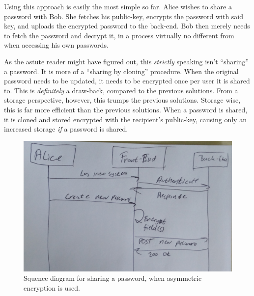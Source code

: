 				Using this approach is easily the most simple so far. Alice wishes to share a password with Bob. She fetches his public-key, encrypts the password with said key, and uploads the encrypted password to the back-end. Bob then merely needs to fetch the password and decrypt it, in a process virtually no different from when accessing his own passwords.

				As the astute reader might have figured out, this \emph{strictly} speaking isn't ``sharing'' a password. It is more of a ``sharing by cloning'' procedure. When the original password needs to be updated, it needs to be encrypted once per user it is shared to. This is \emph{definitely} a draw-back, compared to the previous solutions. From a storage perspective, however, this trumps the previous solutions. Storage wise, this is far more efficient than the previous solutions. When a password is shared, it is cloned and stored encrypted with the recipient's public-key, causing only an increased storage \emph{if} a password is shared.

				\begin{figure}[h!]
					\centering
					\includegraphics[width=\textwidth]{figures/design/sequence_perEntry_small.png}
					\caption{Squence diagram for sharing a password, when asymmetric encryption is used.}
					\label{fig:sequence:asymmetric}
				\end{figure}



